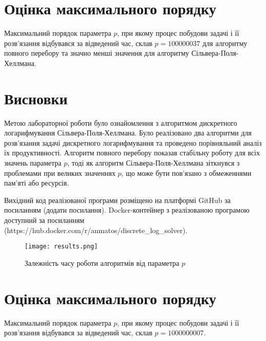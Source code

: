 \documentclass[12pt]{article}
\begin{document}
\section{Оцінка максимального порядку}
Максимальний порядок параметра \( p \), при якому процес побудови задачі і її розв'язання відбувався за відведений час, склав \( p = 100000037 \) для алгоритму повного перебору та значно менші значення для алгоритму Сільвера-Поля-Хеллмана.

\section{Висновки}
Метою лабораторної роботи було ознайомлення з алгоритмом дискретного логарифмування Сільвера-Поля-Хеллмана. Було реалізовано два алгоритми для розв'язання задачі дискретного логарифмування та проведено порівняльний аналіз їх продуктивності. Алгоритм повного перебору показав стабільну роботу для всіх значень параметра \( p \), тоді як алгоритм Сільвера-Поля-Хеллмана зіткнувся з проблемами при великих значеннях \( p \), що може бути пов'язано з обмеженнями пам'яті або ресурсів.

Вихідний код реалізованої програми розміщено на платформі GitHub за посиланням (додати посилання).
Docker-контейнер з реалізованою програмою доступний за посиланням (https://hub.docker.com/r/anmatos/discrete_log_solver).

\begin{figure}[h]
\centering
\texttt{[image: results.png]}
\caption{Залежність часу роботи алгоритмів від параметра \( p \)}
\end{figure}

\section{Оцінка максимального порядку}
Максимальний порядок параметра \( p \), при якому процес побудови задачі і її розв'язання відбувався за відведений час, склав \( p = 1000000007 \).
\end{document}
